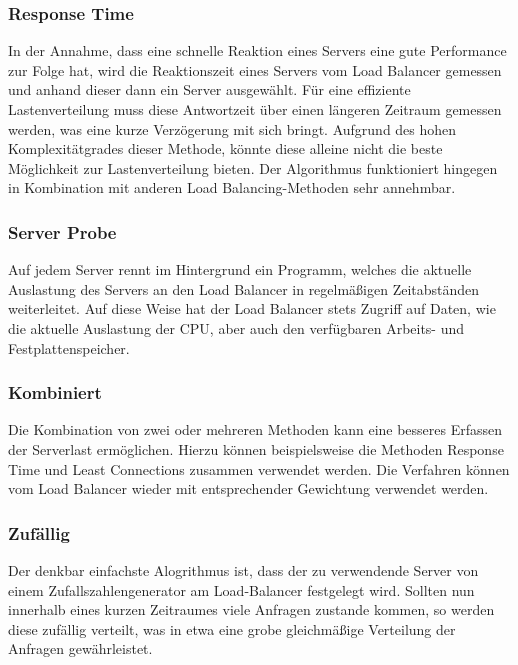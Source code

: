 \documentclass[letterpaper, 12pt]{article}
\let\tempsubsubsection\subsubsection
\renewcommand\subsubsection[1]{\vspace{0cm}\tempsubsubsection{#1}\vspace{0cm}}
\begin{document}
\subsubsection{Response Time}

In der Annahme, dass eine schnelle Reaktion eines Servers eine gute Performance zur Folge hat,
wird die Reaktionszeit eines Servers vom Load Balancer gemessen und anhand dieser dann ein Server
ausgewählt. Für eine effiziente Lastenverteilung muss diese Antwortzeit über einen längeren Zeitraum gemessen werden, was eine kurze Verzögerung mit sich bringt. Aufgrund des hohen Komplexitätgrades dieser Methode, könnte diese alleine nicht die beste Möglichkeit
zur Lastenverteilung bieten. Der Algorithmus funktioniert hingegen in Kombination mit anderen
Load Balancing-Methoden sehr annehmbar. \cite{ausarbeitunglb}

\subsubsection{Server Probe}

Auf jedem Server rennt im Hintergrund ein Programm, welches die aktuelle Auslastung des Servers
an den Load Balancer in regelmäßigen Zeitabständen weiterleitet. Auf diese Weise hat der Load
Balancer stets Zugriff auf Daten, wie die aktuelle Auslastung der CPU, aber auch den verfügbaren
Arbeits- und Festplattenspeicher. \cite{ausarbeitunglb}

\subsubsection{Kombiniert}

Die Kombination von zwei oder mehreren Methoden kann eine besseres Erfassen der Serverlast
ermöglichen. Hierzu können beispielsweise die Methoden Response Time und Least Connections
zusammen verwendet werden. Die Verfahren können vom Load Balancer wieder mit entsprechender
Gewichtung verwendet werden. \cite{ausarbeitunglb}

\subsubsection{Zufällig}

Der denkbar einfachste Alogrithmus ist, dass der zu verwendende Server von einem Zufallszahlengenerator am Load-Balancer festgelegt wird.
Sollten nun innerhalb eines kurzen Zeitraumes viele Anfragen zustande kommen, so werden diese
zufällig verteilt, was in etwa eine grobe gleichmäßige Verteilung der Anfragen gewährleistet. \cite{ausarbeitunglb}
\end{document}
